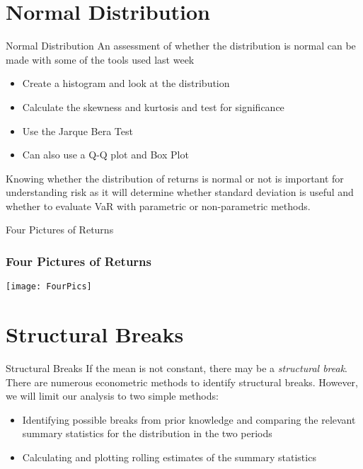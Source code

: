 \documentclass[14pt,xcolor=pdftex,dvipsnames,table]{beamer}
\begin{document}
\section{Normal Distribution}
\begin{frame}{Normal Distribution}
An assessment of whether the distribution is normal can be made with some of the tools used last week
\begin{itemize}
\item Create a histogram and look at the distribution
\item Calculate the skewness and kurtosis and test for significance
\item Use the Jarque Bera Test
\item Can also use a Q-Q plot and Box Plot
\end{itemize}
Knowing whether the distribution of returns is normal or not is important for understanding risk as it will determine whether standard deviation is useful and whether to evaluate VaR with parametric or non-parametric methods. 
\end{frame}

\begin{frame}{Four Pictures of Returns}
\frametitle{Four Pictures of Returns}
\begin{center}
\texttt{[image: FourPics]}
\end{center}
\end{frame} 


\section{Structural Breaks}
\begin{frame}{Structural Breaks}
If the mean is not constant, there may be a \emph{structural break}.  There are numerous econometric methods to identify structural breaks.  %
However, we will limit our analysis to two simple methods:
\vspace{6pt}
\begin{itemize}
\item Identifying possible breaks from prior knowledge and comparing the relevant summary statistics for the distribution in the two periods
\item Calculating and plotting rolling estimates of the summary statistics
\end{itemize}
\end{frame}
\end{document}
